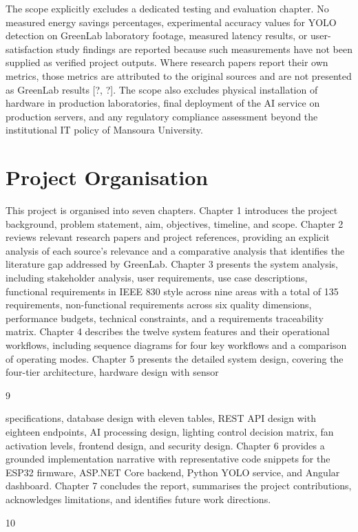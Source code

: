 The scope explicitly excludes a dedicated testing and evaluation chapter. No measured energy savings percentages, experimental accuracy values for YOLO detection on
GreenLab laboratory footage, measured latency results, or user-satisfaction study ﬁndings
are reported because such measurements have not been supplied as veriﬁed project outputs.
Where research papers report their own metrics, those metrics are attributed to the original
sources and are not presented as GreenLab results [?, ?]. The scope also excludes physical
installation of hardware in production laboratories, ﬁnal deployment of the AI service on
production servers, and any regulatory compliance assessment beyond the institutional IT
policy of Mansoura University.



\section{Project Organisation}


This project is organised into seven chapters. Chapter 1 introduces the project background,
problem statement, aim, objectives, timeline, and scope. Chapter 2 reviews relevant research papers and project references, providing an explicit analysis of each source's relevance and a comparative analysis that identiﬁes the literature gap addressed by GreenLab.
Chapter 3 presents the system analysis, including stakeholder analysis, user requirements,
use case descriptions, functional requirements in IEEE 830 style across nine areas with a
total of 135 requirements, non-functional requirements across six quality dimensions, performance budgets, technical constraints, and a requirements traceability matrix. Chapter 4
describes the twelve system features and their operational workﬂows, including sequence
diagrams for four key workﬂows and a comparison of operating modes. Chapter 5 presents
the detailed system design, covering the four-tier architecture, hardware design with sensor

9


speciﬁcations, database design with eleven tables, REST API design with eighteen endpoints, AI processing design, lighting control decision matrix, fan activation levels, frontend design, and security design. Chapter 6 provides a grounded implementation narrative
with representative code snippets for the ESP32 ﬁrmware, ASP.NET Core backend, Python
YOLO service, and Angular dashboard. Chapter 7 concludes the report, summarises the
project contributions, acknowledges limitations, and identiﬁes future work directions.




10
